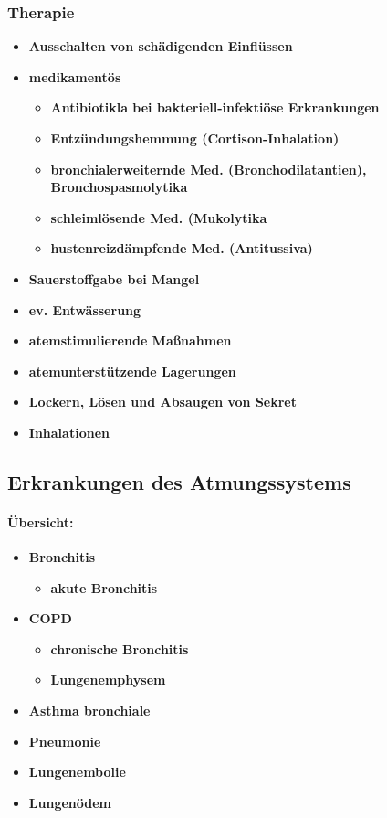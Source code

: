 		\subsubsection*{Therapie}
			\begin{itemize}
				\item \textbf{Ausschalten von schädigenden Einflüssen}
				\item \textbf{medikamentös}
					\begin{itemize}
						\item \textbf{Antibiotikla bei bakteriell-infektiöse Erkrankungen}
						\item \textbf{Entzündungshemmung (Cortison-Inhalation)}
						\item \textbf{bronchialerweiternde Med. (Bronchodilatantien), Bronchospasmolytika}
						\item \textbf{schleimlösende Med. (Mukolytika}
						\item \textbf{hustenreizdämpfende Med. (Antitussiva)}
					\end{itemize}
				\item \textbf{Sauerstoffgabe bei Mangel}
				\item \textbf{ev. Entwässerung}
				\item \textbf{atemstimulierende Maßnahmen}
				\item \textbf{atemunterstützende Lagerungen}
				\item \textbf{Lockern, Lösen und Absaugen von Sekret}
				\item \textbf{Inhalationen}
			\end{itemize}
	\subsection*{Erkrankungen des Atmungssystems}
		\paragraph*{\textbf{Übersicht:}}
		\begin{itemize}
			\item \textbf{Bronchitis}
				\begin{itemize}
					\item \textbf{akute Bronchitis}
				\end{itemize}
			\item \textbf{COPD}
				\begin{itemize}
					\item \textbf{chronische Bronchitis}
					\item \textbf{Lungenemphysem}
				\end{itemize}
			\item \textbf{Asthma bronchiale}
			\item \textbf{Pneumonie}
			\item \textbf{Lungenembolie}
			\item \textbf{Lungenödem}
		\end{itemize}
